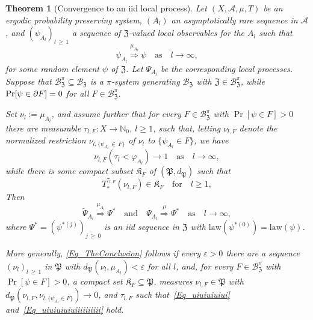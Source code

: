 \documentclass[10pt]{amsart}
\newtheorem{theo}{Theorem}[section]
\theoremstyle{definition}\newtheorem{defi}[theo]{Definition}\newtheorem{rema}[theo]{Remark}\newtheorem{exam}[theo]{Example}\newtheorem{exem}[theo]{Example}\newtheorem{nota}[theo]{Notation}
\newcommand{\clA}{\mathcal{A}}
\newcommand{\clB}{\mathcal{B}}
\newcommand{\law}{\mathrm{law}}
\newcommand{\frkK}{\mathfrak{K}}
\newcommand{\frkP}{\mathfrak{P}}
\newcommand{\frkZ}{\mathfrak{Z}}
\newcommand{\bbN}{\mathbb{N}}
\begin{document}
\begin{theo}[{Convergence to an iid local process}]\label{T_AsyIntStateProcIndep}
Let $(X,\clA,\mu,T)$ be an ergodic probability preserving system, $(A_{l})$ an asymptotically rare sequence in $\clA$, and $(\psi_{A_{l} })_{l\,\geq\,1}$ a sequence of $\frkZ$-valued local observables for the $A_{l}$ such that
\begin{equation}
\psi_{A_{l}}\overset{\mu_{A_{l}}}{\Longrightarrow}\psi \quad \text{as}\quad l\rightarrow\infty,
\end{equation}
for some random element $\psi$ of $\frkZ$. Let $\Psi_{A_{l}}$ be the corresponding local processes. Suppose that $\clB_{\frkZ}^{\pi }\subseteq\clB_{\frkZ}$ is a $\pi$-system generating $\clB_{\frkZ}$ with $\frkZ\in\clB_{\frkZ }^{\pi}$, while $\Pr[\psi\in\partial F]\linebreak =0$ for all $F\in\clB _{\frkZ}^{\pi}$.

Set $\nu_{l}:=\mu_{A_{l}}$, and assume further that for every $F\in\clB_{\frkZ}^{\pi}$ with $\Pr[\psi\in F]>0$ there are measurable $\tau_{l,F}:X\rightarrow\bbN_{0}$, $l\geq1$, such that, letting $\nu_{l,F}$ denote the normalized restriction $\nu_{l,\{\psi_{A_{l}}\,\in\,F\}}$ of $\nu_{l}$ to $\{\psi_{A_{l}}\in F\}$, we have
\begin{equation}\label{Eq_uiuiuiuiui}
\nu_{l,F}\left(\tau_{l}<\varphi_{A_{l}}\right) \longrightarrow 1\quad\text{as}\quad l\rightarrow\infty,
\end{equation}
while there is some compact subset $\frkK_{F}$ of $(\frkP,d_{\frkP})$ such that
\begin{equation}\label{Eq_uiuiuiuiuiiiiiiiiii}
T_{\ast}^{\tau_{l,F}}(\nu_{l,F})\in\frkK_{F}\quad \text{for}\quad l\geq1,
\end{equation}
Then
\begin{equation}\label{Eq_TheConclusion}
\widetilde{\Psi}_{A_{l}}\overset{\mu_{A_{l}}}{\Longrightarrow}\Psi^{\ast }\quad\text{and}\quad\Psi_{A_{l}}\overset{\mu}{\Longrightarrow}\Psi^{\ast }\quad \text{as}\quad l\rightarrow\infty, 
\end{equation}
where $\Psi^{\ast}=(\psi^{\ast(j)})_{j\,\geq\,0}$ is an iid sequence in $\frkZ$ with $\law(\psi^{\ast(0)})=\law(\psi)$.

More generally, \eqref{Eq_TheConclusion} follows if every $\varepsilon>0$ there are a sequence $(\nu_{l})_{l\,\geq\,1}$ in $\frkP$ with $d_{\frkP}(\nu_{l},\mu_{A_{l}})<\varepsilon$ for all $l$, and, for every $F\in\clB_{\frkZ}^{\pi}$ with $\Pr[\psi\in F]>0$, a compact set $\frkK_{F}\subseteq\frkP$, measures $\nu_{l,F}
\in\frkP$ with $d_{\frkP}(\nu_{l,F},\nu_{l,\{\psi_{A_{l}}\in F\}})\rightarrow0$, and $\tau_{l,F}$ such that~\eqref{Eq_uiuiuiuiui} and~\eqref{Eq_uiuiuiuiuiiiiiiiiii} hold.
\end{theo}
\end{document}
